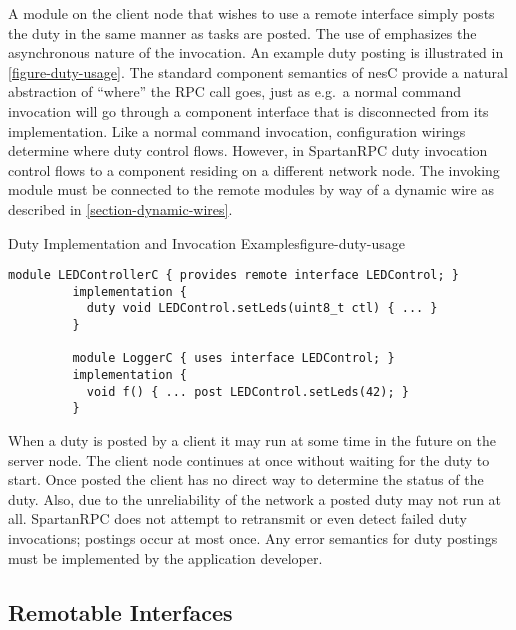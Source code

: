 A module on the client node that wishes to use a remote interface simply
posts the duty in the same manner as tasks are posted. The use of
 emphasizes the asynchronous nature of the invocation. An
example duty posting is illustrated in \autoref{figure-duty-usage}. The
standard component semantics of nesC provide a natural abstraction of
``where'' the RPC call goes, just as e.g.~a normal command invocation
will go through a component interface that is disconnected from its
implementation. Like a normal command invocation, configuration wirings
determine where duty control flows. However, in SpartanRPC duty
invocation control flows to a component residing on a different network
node. The invoking module must be connected to the remote modules by way
of a dynamic wire as described in \autoref{section-dynamic-wires}.

\begin{fpfig}[t]{Duty Implementation and Invocation Examples}{figure-duty-usage}
{
\begin{center}
\vspace{0.5em}
\begin{Verbatim}[fontsize=\small]
         module LEDControllerC { provides remote interface LEDControl; }
         implementation {
           duty void LEDControl.setLeds(uint8_t ctl) { ... }
         } 
 
         module LoggerC { uses interface LEDControl; }
         implementation {
           void f() { ... post LEDControl.setLeds(42); }
         }
\end{Verbatim}
\vspace{0.1em}
\end{center}
}
\end{fpfig}

When a duty is posted by a client it may run at some time in the future
on the server node. The client node continues at once without waiting
for the duty to start. Once posted the client has no direct way to
determine the status of the duty. Also, due to the unreliability of the
network a posted duty may not run at all. SpartanRPC does not attempt to
retransmit or even detect failed duty invocations; postings occur at
most once. Any error semantics for duty postings must be implemented by
the application developer.

\subsection{Remotable Interfaces}
\label{section-remotable}

